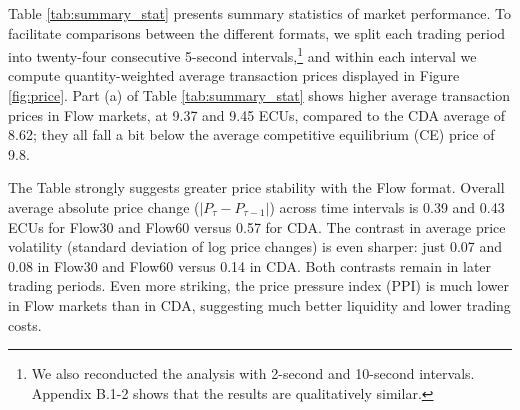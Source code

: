 \documentclass[12pt]{article}
\begin{document}
Table \ref{tab:summary_stat} presents summary statistics of market performance. To facilitate comparisons between the different formats, we split each trading period into twenty-four consecutive 5-second intervals,\footnote{We also reconducted the analysis with 2-second and 10-second intervals. Appendix B.1-2 shows that the results are qualitatively similar.}
and within each interval we compute quantity-weighted average transaction prices displayed in Figure \ref{fig:price}.
Part (a) of Table \ref{tab:summary_stat} %
shows higher average transaction prices in Flow markets, at 9.37 and 9.45 ECUs, compared to the CDA average of 8.62; they all fall a bit below the average competitive equilibrium (CE) price of 9.8. 

The Table strongly suggests greater price stability with the Flow format. 
Overall average absolute price change (\(|P_\tau - P_{\tau-1}|\)) across time intervals is 0.39 and 0.43 ECUs for Flow30 and Flow60 versus 0.57 for CDA. 
The contrast in average price volatility (standard deviation of log price changes) is even sharper:
just 0.07 and 0.08 in Flow30 and Flow60 versus 0.14 in CDA.
Both contrasts remain in later trading periods. %
Even more striking, the price pressure index (PPI) is much lower in Flow markets than in CDA, suggesting much better liquidity and lower trading costs. 
\end{document}
